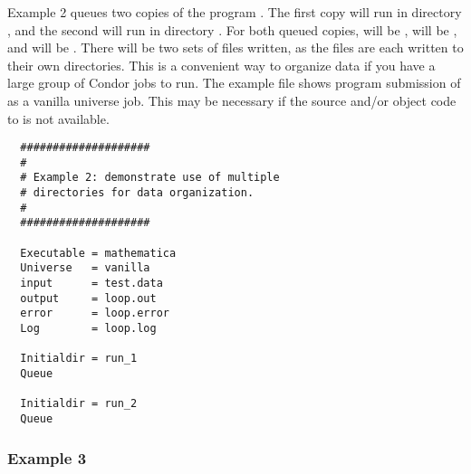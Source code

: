 Example 2 queues two copies of the program . The
first copy will run in directory , and the second will run in
directory . For both queued copies, 
 will be ,
 will be , and
 will be .
There will be two sets of files written,
as the files are each written to their own directories.
This is a convenient way to organize data if you
have a large group of Condor jobs to run. The example file 
shows program submission of
 as a vanilla universe job.
This may be necessary if the source
and/or object code to  is not available.
\begin{verbatim}
  ####################     
  #                       
  # Example 2: demonstrate use of multiple     
  # directories for data organization.      
  #                                        
  ####################                    
                                         
  Executable = mathematica          
  Universe   = vanilla                   
  input      = test.data                
  output     = loop.out                
  error      = loop.error             
  Log        = loop.log                                                    
                                  
  Initialdir = run_1         
  Queue                         
                               
  Initialdir = run_2      
  Queue                     
\end{verbatim}

\subsubsection{Example 3}


